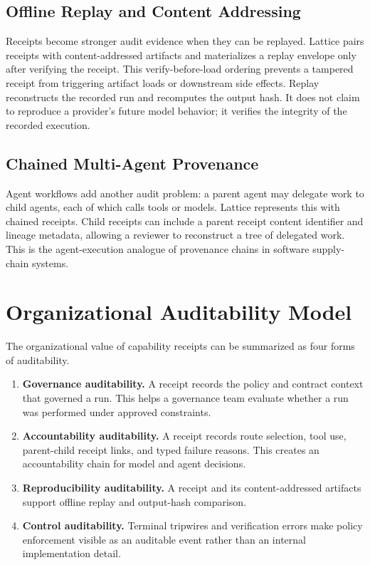 \documentclass[conference]{IEEEtran}
\begin{document}
\subsection{Offline Replay and Content Addressing}

Receipts become stronger audit evidence when they can be replayed. Lattice pairs
receipts with content-addressed artifacts and materializes a replay envelope
only after verifying the receipt. This verify-before-load ordering prevents a
tampered receipt from triggering artifact loads or downstream side effects.
Replay reconstructs the recorded run and recomputes the output hash. It does not
claim to reproduce a provider's future model behavior; it verifies the integrity
of the recorded execution.

\subsection{Chained Multi-Agent Provenance}

Agent workflows add another audit problem: a parent agent may delegate work to
child agents, each of which calls tools or models. Lattice represents this with
chained receipts. Child receipts can include a parent receipt content identifier
and lineage metadata, allowing a reviewer to reconstruct a tree of delegated
work. This is the agent-execution analogue of provenance chains in software
supply-chain systems.

\section{Organizational Auditability Model}

The organizational value of capability receipts can be summarized as four forms
of auditability.

\begin{enumerate}
\item \textbf{Governance auditability.} A receipt records the policy and
contract context that governed a run. This helps a governance team evaluate
whether a run was performed under approved constraints.
\item \textbf{Accountability auditability.} A receipt records route selection,
tool use, parent-child receipt links, and typed failure reasons. This creates an
accountability chain for model and agent decisions.
\item \textbf{Reproducibility auditability.} A receipt and its content-addressed
artifacts support offline replay and output-hash comparison.
\item \textbf{Control auditability.} Terminal tripwires and verification errors
make policy enforcement visible as an auditable event rather than an internal
implementation detail.
\end{enumerate}
\end{document}
